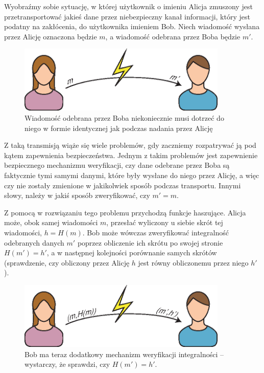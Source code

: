 \documentclass[12pt,a4paper,twoside]{article}
\begin{document}
Wyobraźmy sobie sytuację, w której użytkownik o imieniu Alicja zmuszony jest
przetransportować jakieś dane przez niebezpieczny kanał informacji, który jest
podatny na zakłócenia, do użytkownika imieniem Bob. Niech wiadomość wysłana
przez Alicję oznaczona będzie $m$, a wiadomość odebrana przez Boba będzie $m'$.

\begin{figure}[htb!]
\includegraphics[width=10cm]{img/usage1.eps}
\caption{Wiadomość odebrana przez Boba niekoniecznie musi dotrzeć do niego w
formie identycznej jak podczas nadania przez Alicję}
\label{fig:usage_integrity_check_1}
\end{figure}

Z taką transmisją wiąże się wiele problemów, gdy zaczniemy rozpatrywać ją pod
kątem zapewnienia bezpieczeństwa. Jednym z takim problemów jest zapewnienie
bezpiecznego mechanizmu weryfikacji, czy dane odebrane przez Boba są faktycznie
tymi samymi danymi, które były wysłane do niego przez Alicję, a więc czy nie
zostały zmienione w jakikolwiek sposób podczas transportu. Innymi słowy, należy
w jakiś sposób zweryfikować, czy $m' = m$.

Z pomocą w rozwiązaniu tego problemu przychodzą funkcje haszujące. Alicja może,
obok samej wiadomości $m$, przesłać wyliczony u siebie skrót tej wiadomości,
$h=H(m)$. Bob może wówczas zweryfikować integralność odebranych danych $m'$
poprzez obliczenie ich skrótu po swojej stronie $H(m')=h'$, a w następnej
kolejności porównanie samych skrótów (sprawdzenie, czy obliczony przez Alicję
$h$ jest równy obliczonemu przez niego $h'$).

\begin{figure}[htb!]
\includegraphics[width=10cm]{img/usage1b.eps}
\caption{Bob ma teraz dodatkowy mechanizm weryfikacji integralności --
wystarczy, że sprawdzi, czy $H(m')=h'$.}
\label{fig:usage_integrity_check_2}
\end{figure}
\end{document}
